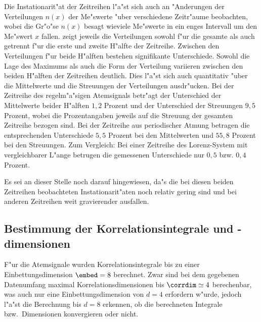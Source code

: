 Die Instationarit"at der Zeitreihen l"a"st sich auch an "Anderungen der Verteilungen
$n(x)$ der Me"swerte "uber verschiedene Zeitr"aume beobachten, wobei die Gr"o"se $n(x)$
besagt wieviele Me"swerte in ein enges Intervall um den Me"swert $x$ fallen.
 zeigt jeweils die Verteilungen sowohl f"ur die gesamte als auch getrennt
f"ur die erste und zweite H"alfte der Zeitreihe. Zwischen den Verteilungen f"ur beide
H"alften bestehen signifikante Unterschiede. Sowohl die Lage des Maximums
als auch die Form der Verteilung variieren zwischen den beiden H"alften der Zeitreihen 
deutlich. Dies l"a"st sich auch quantitativ "uber die Mittelwerte und die
Streuungen der Verteilungen ausdr"ucken. Bei der Zeitreihe des regelm"a"sigen Atemsignals
betr"agt der Unterschied der Mittelwerte beider H"alften $1,2$ Prozent und der Unterschied
der Streuungen $9,5$ Prozent, wobei die Prozentangaben jeweils auf die Streuung
der gesamten Zeitreihe bezogen sind. Bei
der Zeitreihe aus periodischer Atmung betragen die entsprechenden Unterschiede $5,5$
Prozent bei den Mittelwerten und $55,8$ Prozent bei den Streuungen. Zum Vergleich: Bei
einer Zeitreihe des Lorenz-System mit vergleichbarer L"ange betrugen die gemessenen
Unterschiede nur $0,5$ bzw. $0,4$ Prozent.

Es sei an dieser Stelle noch darauf hingewiesen, da"s die bei diesen beiden
Zeitreihen beobachteten Instationarit"aten noch relativ gering sind und bei anderen
Zeitreihen weit gravierender ausfallen.


\subsection{Bestimmung der Korrelationsintegrale und -dimensionen}
F"ur die Atemsignale wurden Korrelationsintegrale bis zu einer Einbettungsdimension
$\embed=8$ berechnet. Zwar sind bei dem gegebenen Datenumfang maximal
Korrelationsdimensionen bis $\corrdim\simeq 4$ berechenbar, was auch nur eine
Einbettungsdimension von $d=4$ erfordern w"urde, jedoch l"a"st die Berechnung  bis $d=8$
erkennen, ob die berechneten Integrale bzw.\  Dimensionen konvergieren oder nicht.

